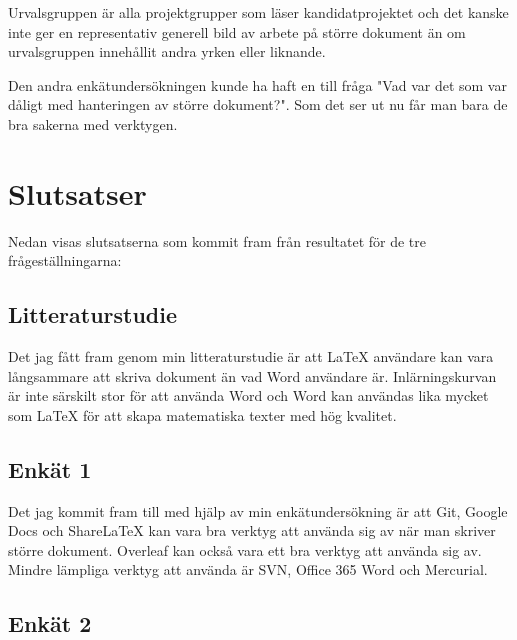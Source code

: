 Urvalsgruppen är alla projektgrupper som läser kandidatprojektet och det kanske inte ger en representativ generell bild av arbete på större dokument än om urvalsgruppen innehållit andra yrken eller liknande.

Den andra enkätundersökningen kunde ha haft en till fråga "Vad var det som var dåligt med hanteringen av större dokument?". Som det ser ut nu får man bara de bra sakerna med verktygen.

\section{Slutsatser}
\label{sec:conclusions-tuhkala}
Nedan visas slutsatserna som kommit fram från resultatet för de tre frågeställningarna:

\subsection{Litteraturstudie}
Det jag fått fram genom min litteraturstudie är att LaTeX användare kan vara långsammare att skriva dokument än vad Word användare är. Inlärningskurvan är inte särskilt stor för att använda Word och Word kan användas lika mycket som LaTeX för att skapa matematiska texter med hög kvalitet.

\subsection{Enkät 1}
Det jag kommit fram till med hjälp av min enkätundersökning är att Git, Google Docs och ShareLaTeX kan vara bra verktyg att använda sig av när man skriver större dokument. Overleaf kan också vara ett bra verktyg att använda sig av. Mindre lämpliga verktyg att använda är SVN, Office 365 Word och Mercurial.

\subsection{Enkät 2}


